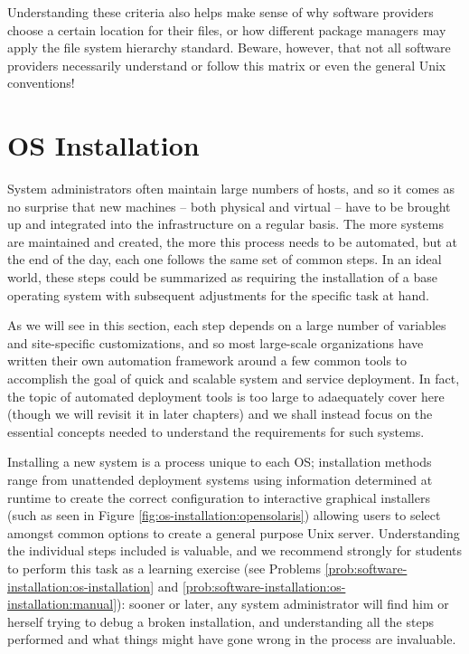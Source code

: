 Understanding these criteria also helps make sense of
why software providers choose a certain location for
their files, or how different package managers may
apply the file system hierarchy standard.  Beware,
however, that not all software providers necessarily
understand or follow this matrix or even the general
Unix conventions!

\section{OS Installation}
\label{software-installation:os-installation}

System administrators often maintain large numbers of
hosts, and so it comes as no surprise that new
machines -- both physical and virtual -- have to be
brought up and integrated into the infrastructure on a
regular basis.  The more systems are maintained and
created, the more this process needs to be automated,
but at the end of the day, each one follows the same
set of common steps.  In an ideal world, these steps
could be summarized as requiring the installation of a
base operating system with subsequent adjustments for
the specific task at hand.

As we will see in this section, each step depends on a
large number of variables and site-specific
customizations, and so most large-scale organizations
have written their own automation framework around a
few common tools to accomplish the goal of quick and
scalable system and service deployment.  In fact, the
topic of automated deployment tools is too large to
adaequately cover here (though we will revisit it in
later chapters) and we shall instead focus on the
essential concepts needed to understand the
requirements for such systems.

Installing a new system is a process unique to each
OS; installation methods range from unattended
deployment systems using information determined at
runtime to create the correct configuration to
interactive graphical installers (such as seen in
Figure \ref{fig:os-installation:opensolaris}) allowing
users to select amongst common options to create a
general purpose Unix server.  Understanding the
individual steps included is valuable, and we
recommend strongly for students to perform this task
as a learning exercise (see Problems
\ref{prob:software-installation:os-installation} and
\ref{prob:software-installation:os-installation:manual}):
sooner or later, any system administrator will find
him or herself trying to debug a broken installation,
and understanding all the steps performed and what
things might have gone wrong in the process are
invaluable.

